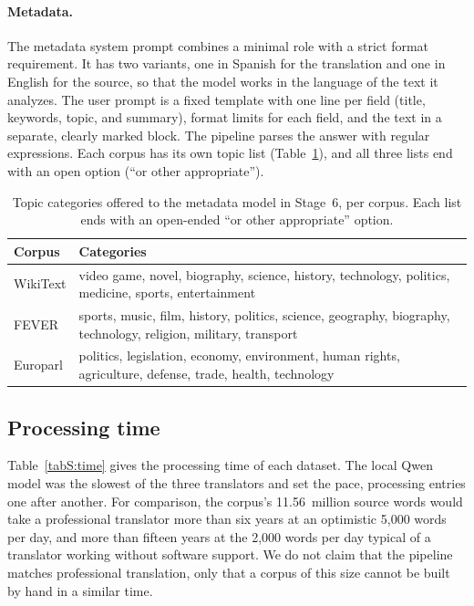 \documentclass[11pt]{article}
\begin{document}
\paragraph{Metadata.} The metadata system prompt combines a minimal role with a strict format requirement. It has two variants, one in Spanish for the translation and one in English for the source, so that the model works in the language of the text it analyzes. The user prompt is a fixed template with one line per field (title, keywords, topic, and summary), format limits for each field, and the text in a separate, clearly marked block. The pipeline parses the answer with regular expressions. Each corpus has its own topic list (Table~\ref{tabS:metadata-taxonomy}), and all three lists end with an open option (``or other appropriate'').

\begin{table}[h!]
\centering
\caption{Topic categories offered to the metadata model in Stage~6, per corpus. Each list ends with an open-ended ``or other appropriate'' option.}
\label{tabS:metadata-taxonomy}
\footnotesize
\begin{tabularx}{\textwidth}{@{}lX@{}}
\toprule
\textbf{Corpus} & \textbf{Categories} \\
\midrule
WikiText\nobreakdash-103 & video game, novel, biography, science, history, technology, politics, medicine, sports, entertainment \\
FEVER & sports, music, film, history, politics, science, geography, biography, technology, religion, military, transport \\
Europarl & politics, legislation, economy, environment, human rights, agriculture, defense, trade, health, technology \\
\bottomrule
\end{tabularx}
\end{table}

\subsection{Processing time}
\label{secS:time}

Table~\ref{tabS:time} gives the processing time of each dataset. The local Qwen model was the slowest of the three translators and set the pace, processing entries one after another. For comparison, the corpus's 11.56~million source words would take a professional translator more than six years at an optimistic 5,000 words per day, and more than fifteen years at the 2,000 words per day typical of a translator working without software support. We do not claim that the pipeline matches professional translation, only that a corpus of this size cannot be built by hand in a similar time.
\end{document}
